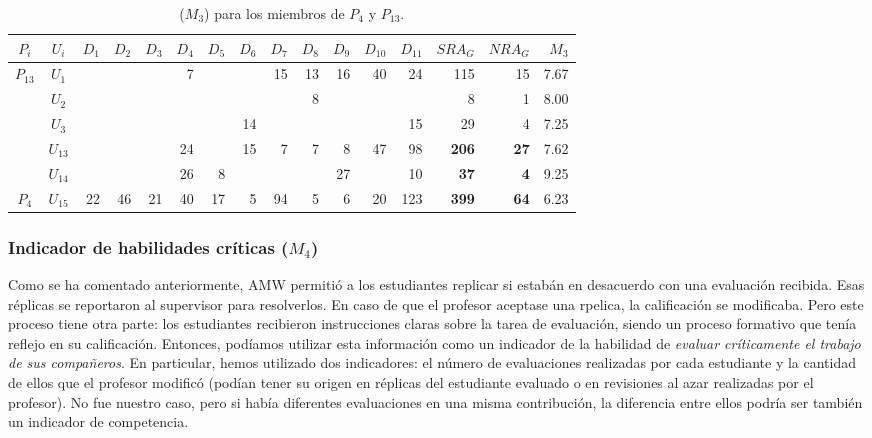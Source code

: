\begin{table}[h]
\centering
\begin{tabular}{|c|c|r|r|r|r|r|r|r|r|r|r|r|r|r|r|}
\hline
\textbf{$P_i$} & \textbf{$U_i$} & \textbf{$D_1$} & \textbf{$D_2$} & \textbf{$D_3$} & \textbf{$D_4$} & \textbf{$D_5$} & \textbf{$D_6$} & \textbf{$D_7$} & \textbf{$D_8$} & \textbf{$D_9$} & \textbf{$D_{10}$} & \textbf{$D_{11}$} &  \textbf{$SRA_G$ } & \textbf{$NRA_G$ } & \textbf{$M_3$} \\ \hline
\hline
\multirow{3}{*}{$P_{13}$} & $U_1$ &   &   &   & 7 &   &     & 15   & 13  & 16  & 40  & 24 & 115 & 15 & 7.67 \\
 & $U_2$ &   &   &   &    &   &     &      & 8    &      &       &     & 8    & 1   & 8.00 \\
 & $U_3$ &   &   &   &    &   & 14  &     &      &      &       & 15 &  29 & 4   & 7.25  \\ \hline
 & $U_{13}$ &   &   &   & 24 &      & 15  & 7   & 7   & 8   & 47  & 98  & \textbf{206} & \textbf{27} & 7.62 \\ 
 & $U_{14}$ &   &   &   & 26 & 8   &      &      &      &  27 &      & 10 &  \textbf{37}  & \textbf{4} & 9.25 \\ 
\multirow{-3}{*}{$P_{4}$} & $U_{15}$ & 22 &  46 & 21   &  40 & 17  & 5 & 94 &  5   & 6  &  20  &  123 & \textbf{399} & \textbf{64} & 6.23 \\ \hline
\end{tabular}
\caption{($M_3$) para los miembros de $P_{4}$ y $P_{13}$.}
\label{table:project-individual-grades}
\end{table}


\subsubsection{Indicador de habilidades críticas ($M_4$)}

Como se ha comentado anteriormente, AMW permitió a los estudiantes replicar si estabán en desacuerdo con una evaluación recibida. Esas réplicas se reportaron al supervisor para resolverlos. En caso de que el profesor aceptase una rpelica, la calificación se modificaba. Pero este proceso tiene otra parte: los estudiantes recibieron instrucciones claras sobre la tarea de evaluación, siendo un proceso formativo que tenía reflejo en su calificación. Entonces, podíamos utilizar esta información como un indicador de la habilidad de \emph{evaluar críticamente el trabajo de sus compañeros}. En particular, hemos utilizado dos indicadores: el número de evaluaciones realizadas por cada estudiante y la cantidad de ellos que el profesor modificó (podían tener su origen en réplicas del estudiante evaluado o en revisiones al azar realizadas por el profesor). No fue nuestro caso, pero si había diferentes evaluaciones en una misma contribución, la diferencia entre ellos podría ser también un indicador de competencia.

